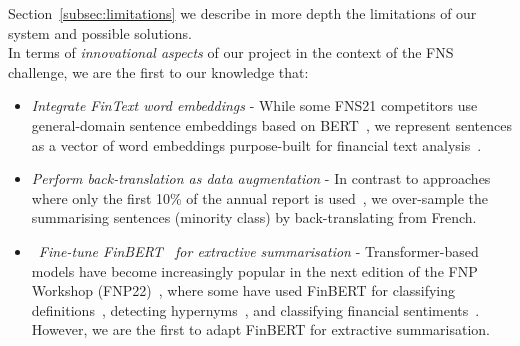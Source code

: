 Section~\ref{subsec:limitations} we describe in more depth the limitations of our system and possible solutions.
\\
In terms of \emph{innovational aspects} of our project in the context of the FNS challenge, we are the first to our knowledge that:
\begin{itemize}
    \item \emph{Integrate FinText word embeddings} - While some FNS21 competitors use general-domain sentence embeddings
    based on BERT~\cite{litvak-vanetik-2021-summarization, gokhan-etal-2021-extractive}, we represent sentences as
    a vector of word embeddings purpose-built for financial text analysis~\cite{rahimikia2021realised}.
    \item \emph{Perform back-translation as data augmentation} - In contrast to approaches where only the first 10\% of
    the annual report is used~\cite{orzhenovskii-2021-t5}, we over-sample the summarising sentences (minority class)
    by back-translating from French.
    \item~\emph{Fine-tune FinBERT~\cite{yang2020finbert} for extractive summarisation} - Transformer-based models have become increasingly
    popular in the next edition of the FNP Workshop (FNP22)~\cite{khanna-etal-2022-transformer, pant-chopra-2022-multilingual},
    where some have used FinBERT for classifying definitions~\cite{ghosh-etal-2022-finrad},
    detecting hypernyms~\cite{peng-etal-2022-discovering}, and classifying financial sentiments~\cite{stepisnik-perdih-etal-2022-sentiment}.
    However, we are the first to adapt FinBERT for extractive summarisation.
\end{itemize}

